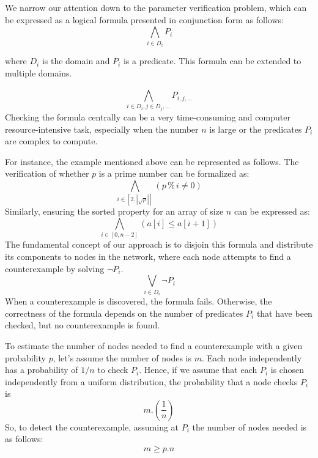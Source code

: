 \documentclass[runningheads]{llncs}
\begin{document}
We narrow our attention down to the parameter verification problem, which can be expressed as a logical formula presented in conjunction form as follows:
\begin{displaymath}
\bigwedge_{i \in D_i} P_{i}
\end{displaymath}

where $D_i$  is the domain and $P_i$  is a predicate. This formula can be extended to multiple domains.

\begin{displaymath}
\bigwedge_{i \in D_i, j \in D_j, \dots}^{} P_{i, j, \dots}
\end{displaymath}
Checking the formula centrally can be a very time-consuming and computer resource-intensive task, especially when the number $n$ is large or the predicates $P_i$ are complex to compute. 

For instance, the example mentioned above can be represented as follows. The verification of whether $p$ is a prime number can be formalized as:
\begin{displaymath}
 \bigwedge_{i \in [2, |\sqrt p|]} (p \mathbin{\%} i \neq 0)
\end{displaymath}
Similarly, ensuring the sorted property for an array of size $n$ can be expressed as:
\begin{displaymath}
\bigwedge_{i \in [0, n - 2]} (a[i] \le a[i+1])
\end{displaymath}
The fundamental concept of our approach is to disjoin this formula and distribute its components to nodes in the network, where each node attempts to find a counterexample by solving $\neg P_{i}$. 
\begin{displaymath}
\bigvee_{i \in D_i} \neg P_{i}
\end{displaymath}
When a counterexample is discovered, the formula fails. Otherwise, the correctness of the formula depends on the number of predicates  $P_{i}$ that have been checked, but no counterexample is found. 

To estimate the number of nodes needed to find a counterexample with a given probability $p$, let's assume the number of nodes is $m$. Each node independently has a probability of $1/n$ to check $P_{i}$. Hence, if we assume that each $P_{i}$ is chosen independently from a uniform distribution, the probability that a node checks $P_{i}$ is 
\begin{displaymath}
 m. (\frac{1}{n})
\end{displaymath}
So, to detect the counterexample, assuming at $P_{i}$ the number of nodes needed is as follows:
\begin{displaymath}
 m \ge p.n
\end{displaymath}
\end{document}
